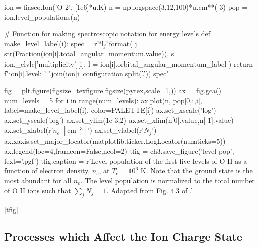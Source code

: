 \begin{pycode}[chapter3]
ion = fiasco.Ion('O 2', [1e6]*u.K)
n = np.logspace(3,12,100)*u.cm**(-3)
pop = ion.level_populations(n)

# Function for making spectroscopic notation for energy levels
def make_level_label(i):
    spec = r'$^{s}\mathrm{{{l}}}_{{{j}}}$'.format(
        j = str(Fraction(ion[i].total_angular_momentum.value)),
        s = ion._elvlc['multiplicity'][i],
        l = ion[i].orbital_angular_momentum_label
    )
    return f"{ion[i].level}: {' '.join(ion[i].configuration.split('.'))} {spec}"

fig = plt.figure(figsize=texfigure.figsize(pytex,scale=1,))
ax = fig.gca()
num_levels = 5
for i in range(num_levels):
    ax.plot(n, pop[0,:,i], label=make_level_label(i), color=PALETTE[i])
ax.set_xscale('log')
ax.set_yscale('log')
ax.set_ylim(1e-3,2)
ax.set_xlim(n[0].value,n[-1].value)
ax.set_xlabel(r'$n_e$ $[\si{\cm}^{-3}]$')
ax.set_ylabel(r'$N_j$')
ax.xaxis.set_major_locator(matplotlib.ticker.LogLocator(numticks=5))
ax.legend(loc=4,frameon=False,ncol=2)
tfig = ch3.save_figure('level-pop', fext='.pgf')
tfig.caption = r'Level population of the first five levels of O II as a function of electron density, $n_e$, at $T_e=10^6$ K. Note that the ground state is the most abundant for all $n_e$. The level population is normalized to the total number of O II ions such that $\sum_jN_j=1$. Adapted from Fig. 4.3 of \citet{phillips_ultraviolet_2008}.'
\end{pycode}
\py[chapter3]|tfig|

\subsection{Processes which Affect the Ion Charge State}\label{subsec:ionization_recombination}

